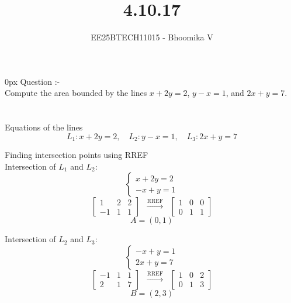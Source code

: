 \documentclass[journal]{IEEEtran}
\begin{document}

\vspace{3cm}

\title{4.10.17}
\author{EE25BTECH11015 - Bhoomika V}
{\let\newpage\relax\maketitle}

\renewcommand{\thefigure}{\theenumi}
\renewcommand{\thetable}{\theenumi}
\setlength{\intextsep}{10pt} %


\renewcommand{\thetable}{\theenumi}
\parindent 0px 
{Question :-} \\ 
Compute the area bounded by the lines $x + 2y = 2$, $y - x = 1$, and $2x + y = 7$.
\\ \\ 
\solution \\
Equations of the lines \\
\[
L_1: x + 2y = 2, \quad 
L_2: y - x = 1, \quad
L_3: 2x + y = 7
\]


 Finding intersection points using RREF \\

Intersection of $L_1$ and $L_2$:
\[
\begin{cases}
x + 2y = 2 \\
-x + y = 1
\end{cases}
\]
\[
\left[\begin{array}{cc|c}
1 & 2 & 2 \\
-1 & 1 & 1
\end{array}\right]
\;\;\xrightarrow{\text{RREF}}\;\;
\left[\begin{array}{cc|c}
1 & 0 & 0 \\
0 & 1 & 1
\end{array}\right]
\]
\[
A= (0,1)
\]

Intersection of $L_2$ and $L_3$:
\[
\begin{cases}
-x + y = 1 \\
2x + y = 7
\end{cases}
\]
\[
\left[\begin{array}{cc|c}
-1 & 1 & 1 \\
2 & 1 & 7
\end{array}\right]
\;\;\xrightarrow{\text{RREF}}\;\;
\left[\begin{array}{cc|c}
1 & 0 & 2 \\
0 & 1 & 3
\end{array}\right]
\]
\[
B = (2,3)
\]
\end{document}
